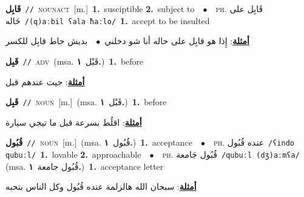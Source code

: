 \documentclass[10pt,a4paper,twoside]{article} %
\begin{document}
\begin{multicols}{2}
{\setlength\topsep{0pt}\textbf{\foreignlanguage{arabic}{قَابِل}}\ {\color{gray}\texttt{//}\color{black}}\ \textsc{noun\textunderscore act}\ [m.]\ \textbf{1.}~susciptible  \textbf{2.}~subject to\ \ $\bullet$\ \ \textsc{ph.} \color{gray} \foreignlanguage{arabic}{قَابِل على حَاله}\color{black}\ {\color{gray}\texttt{/{\sffamily (q)aːbil ʕala ħaːlo}/}\color{black}}\ \textbf{1.}~accept to be insulted\  \begin{flushright}\color{gray}\foreignlanguage{arabic}{\textbf{\underline{\foreignlanguage{arabic}{أمثلة}}}: إِذا هو قابِل على حاله أنا شو دخلني\ $\bullet$\ \  بديش جاط قابِل للكسر}\end{flushright}\color{black}} \vspace{2mm}

{\setlength\topsep{0pt}\textbf{\foreignlanguage{arabic}{قَبِل}}\ {\color{gray}\texttt{//}\color{black}}\ \textsc{adv}\ \color{gray}(msa. \foreignlanguage{arabic}{قَبْل}~\foreignlanguage{arabic}{\textbf{١.}})\color{black}\ \textbf{1.}~before\  \begin{flushright}\color{gray}\foreignlanguage{arabic}{\textbf{\underline{\foreignlanguage{arabic}{أمثلة}}}: جيت عندهم قبل}\end{flushright}\color{black}} \vspace{2mm}

{\setlength\topsep{0pt}\textbf{\foreignlanguage{arabic}{قَبِل}}\ {\color{gray}\texttt{//}\color{black}}\ \textsc{noun}\ [m.]\ \color{gray}(msa. \foreignlanguage{arabic}{قَبْل}~\foreignlanguage{arabic}{\textbf{١.}})\color{black}\ \textbf{1.}~before\  \begin{flushright}\color{gray}\foreignlanguage{arabic}{\textbf{\underline{\foreignlanguage{arabic}{أمثلة}}}: اقلُط بسرعة قبل ما تيجي سيارة}\end{flushright}\color{black}} \vspace{2mm}

{\setlength\topsep{0pt}\textbf{\foreignlanguage{arabic}{قُبُول}}\ {\color{gray}\texttt{//}\color{black}}\ \textsc{noun}\ [m.]\ \color{gray}(msa. \foreignlanguage{arabic}{قُبُول}~\foreignlanguage{arabic}{\textbf{١.}})\color{black}\ \textbf{1.}~acceptance\ \ $\bullet$\ \ \textsc{ph.} \color{gray} \foreignlanguage{arabic}{عنده قُبُول}\color{black}\ {\color{gray}\texttt{/{\sffamily ʕindo qubuːl}/}\color{black}}\ \textbf{1.}~lovable  \textbf{2.}~approachable\ \ $\bullet$\ \ \textsc{ph.} \color{gray} \foreignlanguage{arabic}{قُبُول جَامعة}\color{black}\ {\color{gray}\texttt{/{\sffamily qubuːl (dʒ)aːmʕa}/}\color{black}}\ \color{gray} (msa. \foreignlanguage{arabic}{قُبُول جامعة}~\foreignlanguage{arabic}{\textbf{١.}})\color{black}\ \textbf{1.}~acceptance letter\  \begin{flushright}\color{gray}\foreignlanguage{arabic}{\textbf{\underline{\foreignlanguage{arabic}{أمثلة}}}: سبحان الله هالزلمة عنده قُبُول وكل الناس بتحبه}\end{flushright}\color{black}} \vspace{2mm}


\end{multicols}
\end{document}
